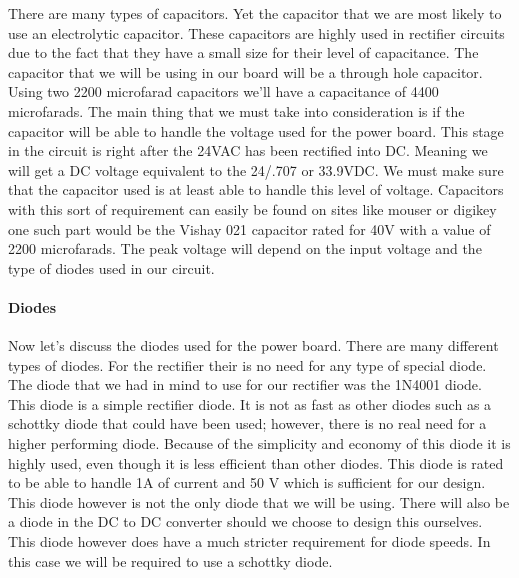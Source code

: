 There are many types of capacitors. Yet the capacitor that we are most likely
to use an electrolytic capacitor. These capacitors are highly used in
rectifier circuits due to the fact that they have a small size for their level
of capacitance.\cite{link6} 
The capacitor
that we will be using in our board will be a through hole capacitor. Using two
2200 microfarad capacitors we{}'ll have a capacitance of 4400 microfarads. The
main thing that we must take into consideration is if the capacitor will be
able to handle the voltage used for the power board. This stage in the circuit
is right after the 24VAC has been rectified into DC. Meaning we will get a DC
voltage equivalent to the 24/.707 or 33.9VDC. We must make sure that the
capacitor used is at least able to handle this level of voltage.
Capacitors with this sort of requirement can easily be found on sites like
mouser or digikey one such part would be the Vishay 021 capacitor rated for 40V
with a value of 2200 microfarads. The peak voltage will depend on the input
voltage and the type of diodes used in our circuit.

\paragraph{Diodes}

Now let{}'s discuss the diodes used for the power board. There are many
different types of diodes. For the rectifier their is no need for any type of
special diode. The diode that we had in mind to use for our rectifier was the
1N4001 diode. This diode is a simple rectifier diode. It is not as fast as
other diodes such as a schottky diode that could have been used; however, there
is no real need for a higher performing diode. Because of the simplicity and
economy of this diode it is highly used, even though it is less efficient than
other diodes. This diode is rated to be able to handle 1A of current and 50 V
which is sufficient for our design. This diode however is not the only diode
that we will be using. There will also be a diode in the DC to DC converter
should we choose to design this ourselves. This diode however does have a much
stricter requirement for diode speeds. In this case we will be required to use
a schottky diode.
\cite{link7}

